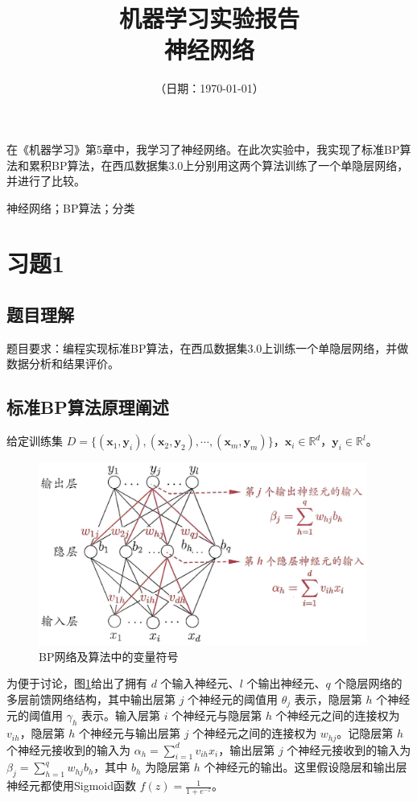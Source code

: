 \documentclass{ctexart}
\title{\textbf{机器学习实验报告\\{\Large{神经网络}}}} %
\author{\sffamily{朱天泽}} %
\date{（日期：\today）} %
\begin{document}
	\maketitle
	在《机器学习》第5章中，我学习了神经网络。在此次实验中，我实现了标准BP算法和累积BP算法，在西瓜数据集3.0上分别用这两个算法训练了一个单隐层网络，并进行了比较。
	
	 神经网络；BP算法；分类
	
	\section{习题1}
	\subsection{题目理解}
	题目要求：编程实现标准BP算法，在西瓜数据集3.0上训练一个单隐层网络，并做数据分析和结果评价。
	\subsection{标准BP算法原理阐述}
	给定训练集 $D=\{(\bm{x}_1,\bm{y}_i),(\bm{x}_2,\bm{y}_2),\cdots,(\bm{x}_m,\bm{y}_m)\}$，$\bm{x}_i\in\mathbb{R}^d$，$\bm{y}_i\in\mathbb{R}^l$。
	
	\begin{figure}[!htb]
		\centering
		\includegraphics[scale=1,height=6cm]{../image/BP网络及算法中的变量符号.png}
		\caption{BP网络及算法中的变量符号}
		\label{BP网络及算法中的变量符号}
	\end{figure}
	
	为便于讨论，图\ref{BP网络及算法中的变量符号}给出了拥有 $d$ 个输入神经元、$l$ 个输出神经元、$q$ 个隐层网络的多层前馈网络结构，其中输出层第 $j$ 个神经元的阈值用 $\theta_j$ 表示，隐层第 $h$ 个神经元的阈值用 $\gamma_h$ 表示。输入层第 $i$ 个神经元与隐层第 $h$ 个神经元之间的连接权为 $v_{ih}$，隐层第 $h$ 个神经元与输出层第 $j$ 个神经元之间的连接权为 $w_{hj}$。记隐层第 $h$ 个神经元接收到的输入为 $\alpha_h=\sum\limits_{i=1}^d v_{ih}x_i$，输出层第 $j$ 个神经元接收到的输入为 $\beta_j=\sum\limits_{h=1}^q w_{hj}b_h$，其中 $b_h$ 为隐层第 $h$ 个神经元的输出。这里假设隐层和输出层神经元都使用Sigmoid函数 $f(z)=\frac{1}{1+e^{-z}}$。
\end{document}
